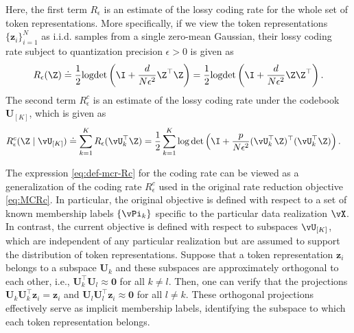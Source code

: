 \documentclass[../../book-main.tex]{subfiles}
\begin{document}
Here, the first term $R_{\epsilon}$ is an estimate of the lossy coding rate for the whole set of token representations. More specifically, if we view the token representations $\{\bm z_i\}_{i=1}^N$ as i.i.d. samples from a single zero-mean Gaussian, their lossy coding rate subject to quantization precision $\epsilon > 0$ is given as
\begin{equation}\label{eq:coding_rate}
    R_{\epsilon}(\Z) \doteq \frac{1}{2}\textrm{logdet}\left(\I + \frac{d}{N\epsilon^{2}}\Z^{\top}\Z\right) = \frac{1}{2}\textrm{logdet}\left(\I + \frac{d}{N\epsilon^{2}}\Z\Z^{\top}\right).
\end{equation}
The second term $R_{\epsilon}^c$ is an estimate of the lossy coding rate under the codebook $\bm U_{[K]}$, which is given as 
\begin{equation}
\begin{aligned}
    R_{\epsilon}^c(\Z \mid \vU_{[K]}) &\doteq \sum_{k=1}^{K}R_{\epsilon}(\vU_k^{\top} \Z) = \frac{1}{2}\sum_{k=1}^{K}\log\det\left(\I +
    \frac{p}{N\epsilon^{2}}(\vU_k^{\top}\Z)^{\top}(\vU_k^{\top}\Z)\right).
\end{aligned}
\label{eq:def-mcr-Rc}
\end{equation}

\begin{remark}
    The expression \eqref{eq:def-mcr-Rc} for the coding rate can be viewed as a generalization of the coding rate \(R_\epsilon^{c}\) used in the original rate reduction objective \eqref{eq:MCRc}. In particular, the original objective is defined with respect to a set of known membership labels \(\{\vPi_{k}\}\) specific to the particular data realization \(\vX\). In contrast, the current objective is defined with respect to subspaces \(\vU_{[K]}\), which are independent of any particular realization but are assumed to support the distribution of token representations. Suppose that a token representation $\bm z_i$ belongs to a subspace $\bm U_k$ and these subspaces are approximately orthogonal to each other, i.e., $\bm U_k^\top \bm U_l \approx \bm 0$ for all $k \neq l$. Then, one can verify that the projections $\bm U_k\bm U_k^\top \bm z_i  = \bm z_i$ and  $\bm U_l\bm U_l^\top \bm z_i \approx \bm 0$ for all $l \neq k$. These orthogonal projections effectively serve as implicit membership labels, identifying the subspace to which each token representation belongs. 
\end{remark}
\end{document}
